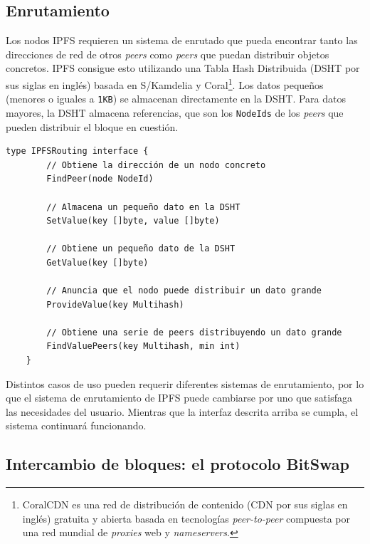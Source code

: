 \documentclass[12pt]{article} %
\begin{document}

\subsection{Enrutamiento} %
\label{sub:enrutamiento}

Los nodos IPFS requieren un sistema de enrutado que pueda encontrar tanto las direcciones de red de otros \textit{peers} como \textit{peers} que puedan distribuir objetos concretos. IPFS consigue esto utilizando una Tabla Hash Distribuida (DSHT por sus siglas en inglés) basada en S/Kamdelia y Coral\footnote{CoralCDN es una red de distribución de contenido (CDN por sus siglas en inglés) gratuita y abierta basada en tecnologías \textit{peer-to-peer} compuesta por una red mundial de \textit{proxies} web y \textit{nameservers}.}. Los datos pequeños (menores o iguales a \texttt{1KB}) se almacenan directamente en la DSHT. Para datos mayores, la DSHT almacena referencias, que son los \texttt{NodeIds} de los \textit{peers} que pueden distribuir el bloque en cuestión.

\begin{lstlisting}[caption={Interfaz de la DSHT.}, language=Golang]
	type IPFSRouting interface {
		// Obtiene la dirección de un nodo concreto
		FindPeer(node NodeId)

		// Almacena un pequeño dato en la DSHT
		SetValue(key []byte, value []byte)

		// Obtiene un pequeño dato de la DSHT
		GetValue(key []byte)

		// Anuncia que el nodo puede distribuir un dato grande
		ProvideValue(key Multihash)

		// Obtiene una serie de peers distribuyendo un dato grande
		FindValuePeers(key Multihash, min int)
	}
\end{lstlisting}

Distintos casos de uso pueden requerir diferentes sistemas de enrutamiento, por lo que el sistema de enrutamiento de IPFS  puede cambiarse por uno que satisfaga las necesidades del usuario. Mientras que la interfaz descrita arriba se cumpla, el sistema continuará funcionando.


\subsection{Intercambio de bloques: el protocolo BitSwap} %
\label{sub:intercambio_de_bloques_el_protocolo_bitswap}
\end{document}

